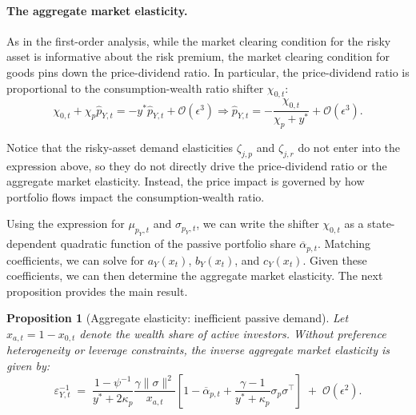 \documentclass[12pt,english]{article}
\newtheorem{prop}{Proposition}
\begin{document}
\paragraph{The aggregate market elasticity.} As in the first-order analysis, while the market clearing condition for the risky asset is informative about the risk premium, the market clearing condition for goods pins down the price-dividend ratio. 
In particular, the price-dividend ratio is proportional to the consumption-wealth ratio shifter $\chi_{0,t}$:
\begin{equation}
    \chi_{0,t} + \chi_p \hat{p}_{Y,t} = - y^* \hat{p}_{Y,t}  + \mathcal{O}(\epsilon^3)\Rightarrow \hat{p}_{Y,t} = - \frac{\chi_{0,t}}{\chi_p + y^*} + \mathcal{O}(\epsilon^3).
\end{equation}

Notice that the risky-asset demand elasticities $\zeta_{j,p}$ and $\zeta_{j,r}$ do not enter into the expression above, so they do not directly drive the price-dividend ratio or the aggregate market elasticity.
Instead, the price impact is governed by how portfolio flows impact the consumption-wealth ratio. %


Using the expression for $\mu_{p_{Y},t}$ and $\sigma_{p_Y,t}$, we can write the shifter $\chi_{0,t}$ as a state-dependent quadratic function of the passive portfolio share $\overline{\alpha}_{p,t}$.
Matching coefficients, we can solve for $a_Y(x_t)$, $b_Y(x_t)$, and $c_Y(x_t)$.
Given these coefficients, we can then determine the aggregate market elasticity.
The next proposition provides the main result.

\begin{prop}[Aggregate elasticity: inefficient passive demand]\label{prop:elasticity_passive_demand}
    Let $x_{a,t}=1-x_{0,t}$ denote the wealth share of active investors.
    Without preference heterogeneity or leverage constraints, the inverse aggregate market elasticity is given by:
    \begin{equation}\label{eq:elasticity_passive_demand}
        \varepsilon_{Y,t}^{-1}
        \;=\;
        \frac{1-\psi^{-1}}{y^* + 2\kappa_p} \frac{\gamma\|\sigma\|^2}{x_{a,t}} \left[ 1- \overline{\alpha}_{p,t} + \frac{\gamma-1}{y^* + \kappa_p}\sigma_p \sigma^\top\right]
        \;+\;\mathcal{O}\!\left(\epsilon^{2}\right).
    \end{equation}
\end{prop}
\end{document}
